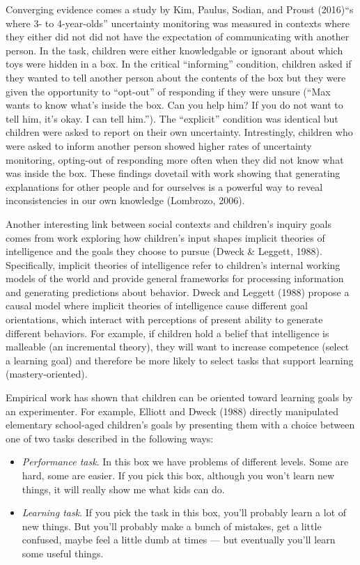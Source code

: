 \documentclass[english,floatsintext,man]{apa6}
\providecommand{\tightlist}{%
  \setlength{\itemsep}{0pt}\setlength{\parskip}{0pt}}
\theoremstyle{definition}
\theoremstyle{definition}
\theoremstyle{definition}
\theoremstyle{remark}
\begin{document}
Converging evidence comes a study by Kim, Paulus, Sodian, and Proust
(2016)\enquote{s where 3- to 4-year-olds} uncertainty monitoring was
measured in contexts where they either did not did not have the
expectation of communicating with another person. In the task, children
were either knowledgable or ignorant about which toys were hidden in a
box. In the critical \enquote{informing} condition, children asked if
they wanted to tell another person about the contents of the box but
they were given the opportunity to \enquote{opt-out} of responding if
they were unsure (\enquote{Max wants to know what's inside the box. Can
you help him? If you do not want to tell him, it's okay. I can tell
him.}). The \enquote{explicit} condition was identical but children were
asked to report on their own uncertainty. Intrestingly, children who
were asked to inform another person showed higher rates of uncertainty
monitoring, opting-out of responding more often when they did not know
what was inside the box. These findings dovetail with work showing that
generating explanations for other people and for ourselves is a powerful
way to reveal inconsistencies in our own knowledge (Lombrozo, 2006).

Another interesting link between social contexts and children's inquiry
goals comes from work exploring how children's input shapes implicit
theories of intelligence and the goals they choose to pursue (Dweck \&
Leggett, 1988). Specifically, implicit theories of intelligence refer to
children's internal working models of the world and provide general
frameworks for processing information and generating predictions about
behavior. Dweck and Leggett (1988) propose a causal model where implicit
theories of intelligence cause different goal orientations, which
interact with perceptions of present ability to generate different
behaviors. For example, if children hold a belief that intelligence is
malleable (an incremental theory), they will want to increase competence
(select a learning goal) and therefore be more likely to select tasks
that support learning (mastery-oriented).

Empirical work has shown that children can be oriented toward learning
goals by an experimenter. For example, Elliott and Dweck (1988) directly
manipulated elementary school-aged children's goals by presenting them
with a choice between one of two tasks described in the following ways:

\begin{itemize}
\tightlist
\item
  \emph{Performance task}. In this box we have problems of different
  levels. Some are hard, some are easier. If you pick this box, although
  you won't learn new things, it will really show me what kids can do.
\item
  \emph{Learning task}. If you pick the task in this box, you'll
  probably learn a lot of new things. But you'll probably make a bunch
  of mistakes, get a little confused, maybe feel a little dumb at times
  --- but eventually you'll learn some useful things.
\end{itemize}
\end{document}
